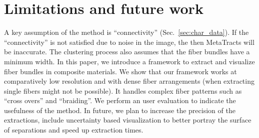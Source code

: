 \section{Limitations and future work}
\label{sec:conclusions}
\color{red}
 A key assumption of the method is ``connectivity'' (Sec.~\ref{sec:char_data}).
If the ``connectivity'' is not satisfied due to noise in the image, the then MetaTracts will be inaccurate. 
The clustering process also assumes that the fiber bundles have a minimum width.
\color{green}
In this paper, we introduce a framework to extract and visualize fiber bundles in composite materials. We show that our framework works at comparatively low resolution and with dense fiber arrangements (when extracting single fibers might not be possible). It handles complex fiber patterns such as ``cross overs'' and ``braiding''. We perform an user evaluation to indicate the usefulness of the method.
\color{black} In future, we plan to increase the precision of the extractions, include uncertainty based visualization to better portray the surface of separations and speed up extraction times.
%


